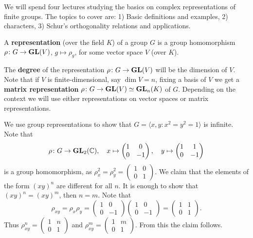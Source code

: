 \chapter{}


We will spend 
four lectures studying the basics on complex representations of finite groups. 
The topics to cover are: 1) Basic definitions and examples, 2) characters, 3)
Schur's orthogonality relations and applications. 

\begin{definition}
	A \textbf{representation} (over the field $K$) of a group $G$ is a group homomorphism
	$\rho\colon G\to\mathbf{GL}(V)$, $g\mapsto\rho_g$, for some vector space $V$ (over $K$).
\end{definition}

The \textbf{degree} of the representation $\rho\colon G\to\mathbf{GL}(V)$ will be the dimension of $V$. Note that
if $V$ is finite-dimensional, say $\dim V=n$, fixing a basis of $V$ we get a \textbf{matrix representation} 
$\rho\colon G\to\mathbf{GL}(V)\simeq\mathbf{GL}_n(K)$ of $G$. Depending on the context we will use either
representations on vector spaces or matrix representations.  

\begin{example}
	We use group representations to show that 
	$G=\langle x,y:x^2=y^2=1\rangle$ is infinite. Note that
	\[
	\rho\colon G\to\mathbf{GL}_2(\mathbb{C}),
	\quad
	x\mapsto\begin{pmatrix}
		1&0\\
		0&-1	
	\end{pmatrix},\quad
 	y\mapsto\begin{pmatrix}
		1&1\\
		0&-1	
	\end{pmatrix}
 	\]
 	is a group homomorphism, as 
 	$\rho_x^2=\rho_y^2=\begin{pmatrix}
		1&0\\
		0&1	
	\end{pmatrix}$. We claim that the elements of the form $(xy)^n$ are
	different for all $n$. It is enough to show that   
	$(xy)^n=(xy)^m$, then $n=m$. Note that
	\[
	\rho_{xy}=\rho_x\rho_y=\begin{pmatrix}
		1&0\\
		0&-1	
	\end{pmatrix}
	\begin{pmatrix}
		1&0\\
		0&-1	
	\end{pmatrix}
	=\begin{pmatrix}
		1&1\\
		0&1	
	\end{pmatrix}.
	\]
	Thus $\rho_{xy}^n=\begin{pmatrix}
		1&n\\
		0&1	
	\end{pmatrix}$ and 
	$\rho_{xy}^m=\begin{pmatrix}
		1&m\\
		0&1	
	\end{pmatrix}$. From this the claim follows.
\end{example}

